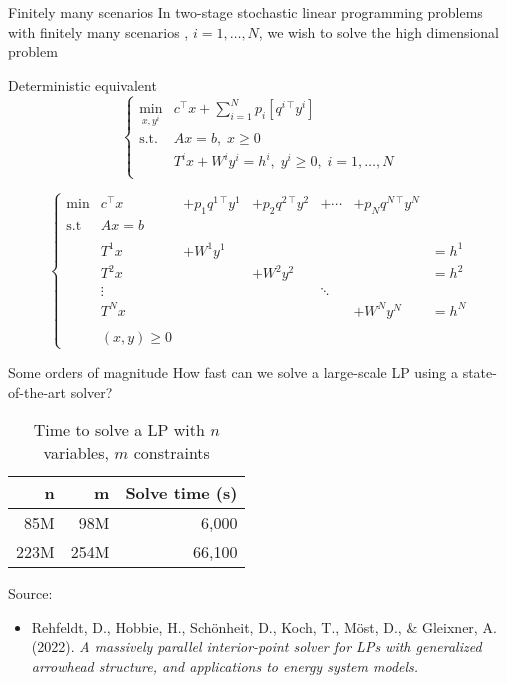 \begin{frame}{Finitely many scenarios}
In two-stage stochastic linear programming problems with finitely many scenarios
, $i=1,\ldots,N$, we wish to solve the high dimensional problem
\begin{block}{Deterministic equivalent}
\[
\left\{
\begin{array}{ll}
\displaystyle \min_{x,y^i} & c^\top x+\sum_{i=1}^N p_i [q^{i\,\top} y^i]\\
\mbox{s.t.} & Ax =  b,\; x\geq 0 \\&T^i x+W^i y^i=h^i,\; y^i\geq 0, \; i=1,\ldots,N\\
\end{array}
\right.
\]

\pula

\pause
{}


\[
\left\{
\begin{array}{lllllllllllll}
\min & c^\top x &+ p_1q^{1\,\top} y^1  &+ p_2q^{2\,\top} y^2 &+ \cdots  &+ p_Nq^{N\,\top} y^N \\
\mbox{s.t}& Ax =b\\
&\\
& T^1x           &+ W^1y^1&&&&= h^1 \\
& T^2x           &&+ W^2y^2&&&= h^2 \\
& \vdots         &&&\ddots \\
& T^Nx           &&&&+ W^Ny^N&= h^N \\
&\\
&(x, y)\geq 0
\end{array}
\right.
\]

\end{block}
\end{frame}

\begin{frame}{Some orders of magnitude}
  How fast can we solve a large-scale LP using a state-of-the-art solver?


  \begin{table}
  \begin{tabular}{rrr}
    \hline
    n & m & Solve time (s) \\
    \hline
    85M & 98M & 6,000 \\
    223M & 254M & 66,100 \\
    \hline
  \end{tabular}
  \caption{Time to solve a LP with $n$ variables, $m$ constraints}
  \end{table}

  \vspace{2cm}

  Source:
  \begin{itemize}
    \item Rehfeldt, D., Hobbie, H., Schönheit, D., Koch, T., Möst, D., \& Gleixner, A. (2022).
      \emph{A massively parallel interior-point solver for LPs with generalized arrowhead structure, and applications to energy system models.}
  \end{itemize}


\end{frame}


